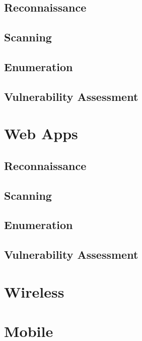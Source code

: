 \documentclass[11pt,a4paper]{book}
\begin{document}
\section{Reconnaissance}
\section{Scanning}
\section{Enumeration}
\section{Vulnerability Assessment}



\chapter{Web Apps}
\section{Reconnaissance}
\section{Scanning}
\section{Enumeration}
\section{Vulnerability Assessment}

\chapter{Wireless}



\chapter{Mobile}





\end{document}
